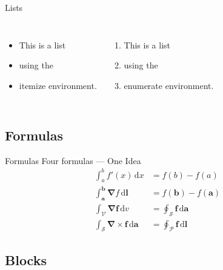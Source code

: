 \documentclass[fleqn,compress,utf8,aspectratio=169,t]{beamer}
\begin{document}
\begin{frame}{Lists}
	\begin{columns}[t]
		\begin{itemize}
			\item This is a list
			\item using the
			\item itemize environment.
		\end{itemize}
		\begin{enumerate}
			\item This is a list
			\item using the
			\item enumerate environment.
		\end{enumerate}
	\end{columns}
\end{frame}

\subsection{Formulas}

\begin{frame}{Formulas}
	Four formulas --- One Idea
	\begin{align}
		\int^{b}_{a} f'(x) \, \mathrm{d}x                                          & = f(b) - f(a)                                          \\
		\int^\mathbf{b}_\mathbf{a} \boldsymbol\nabla f\,\mathrm{d}\mathbf{l}       & = f(\mathbf{b}) - f(\mathbf{a})                        \\
		\int_\mathcal{V} \boldsymbol\nabla\mathbf{f} \, \mathrm{d}v                & = \oint_\mathcal{S} \mathbf{f} \, \mathrm{d}\mathbf{a} \\
		\int_\mathcal{S} \boldsymbol\nabla\times\mathbf{f} \, \mathrm{d}\mathbf{a} & = \oint_\mathcal{P} \mathbf{f} \, \mathrm{d}\mathbf{l}
	\end{align}
\end{frame}

\subsection{Blocks}
\end{document}
